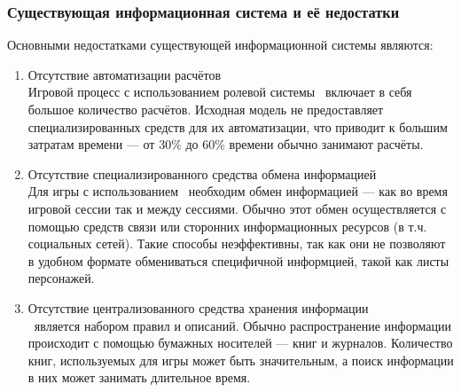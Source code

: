 \subsubsection{Существующая информационная система и её недостатки}


Основными недостатками существующей информационной системы являются:
\begin{enumerate}
\item Отсутствие автоматизации расчётов\\
Игровой процесс с использованием ролевой системы \dnd\ включает в себя большое количество расчётов. Исходная модель не предоставляет специализированных средств для их автоматизации, что приводит к большим затратам времени --- от 30\% до 60\% времени обычно занимают расчёты.
\item Отсутствие специализированного средства обмена информацией\\
Для игры с использованием \dnd\ необходим обмен информацией --- как во время игровой сессии так и между сессиями. Обычно этот обмен осуществляется с помощью средств связи или сторонних информационных ресурсов (в т.ч. социальных сетей). Такие способы неэффективны, так как они не позволяют в удобном формате обмениваться специфичной информцией, такой как листы персонажей.
\item Отсутствие централизованного средства хранения информации\\
\dnd\ является набором правил и описаний. Обычно распространение информации происходит с помощью бумажных носителей --- книг и журналов. Количество книг, используемых для игры может быть значительным, а поиск информации в них может занимать длительное время.
\end{enumerate}

